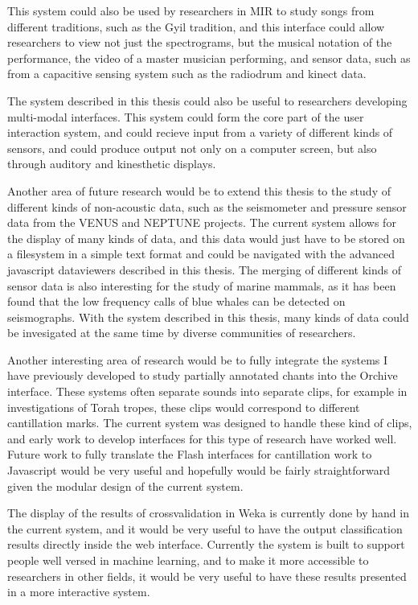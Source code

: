 This system could also be used by researchers in MIR to study songs
from different traditions, such as the Gyil tradition, and this
interface could allow researchers to view not just the spectrograms,
but the musical notation of the performance, the video of a master
musician performing, and sensor data, such as from a capacitive
sensing system such as the radiodrum and kinect data.

The system described in this thesis could also be useful to
researchers developing multi-modal interfaces.  This system could form
the core part of the user interaction system, and could recieve input
from a variety of different kinds of sensors, and could produce output
not only on a computer screen, but also through auditory and
kinesthetic displays.

Another area of future research would be to extend this thesis to the
study of different kinds of non-acoustic data, such as the seismometer
and pressure sensor data from the VENUS and NEPTUNE projects.  The
current system allows for the display of many kinds of data, and this
data would just have to be stored on a filesystem in a simple text
format and could be navigated with the advanced javascript dataviewers
described in this thesis.  The merging of different kinds of sensor
data is also interesting for the study of marine mammals, as it has
been found that the low frequency calls of blue whales can be detected
on seismographs.  With the system described in this thesis, many kinds
of data could be invesigated at the same time by diverse communities
of researchers.

Another interesting area of research would be to fully integrate the
systems I have previously developed to study partially annotated
chants into the Orchive interface.  These systems often separate
sounds into separate clips, for example in investigations of Torah
tropes, these clips would correspond to different cantillation marks.
The current system was designed to handle these kind of clips, and
early work to develop interfaces for this type of research have worked
well.  Future work to fully translate the Flash interfaces for
cantillation work to Javascript would be very useful and hopefully
would be fairly straightforward given the modular design of the
current system.

The display of the results of crossvalidation in Weka is currently
done by hand in the current system, and it would be very useful to
have the output classification results directly inside the web
interface.  Currently the system is built to support people well
versed in machine learning, and to make it more accessible to
researchers in other fields, it would be very useful to have these
results presented in a more interactive system.
